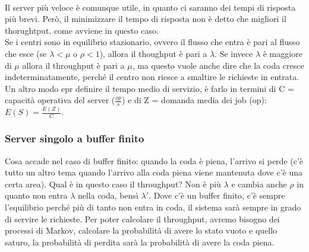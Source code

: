 \documentclass{article}
\begin{document}
\\Il server più veloce è comunque utile, in quanto ci saranno dei tempi di risposta più brevi. Però, il minimizzare il tempo di risposta non è detto che migliori il thorughtput, come avviene in questo caso.\\ Se i centri sono in equilibrio stazionario, ovvero il flusso che entra è pari al flusso che esce (se $\lambda < \mu$ o $\rho < 1$), allora il thoughput è pari a $\lambda$. Se invece $\lambda$ è maggiore di $\mu$ allora il throughput è pari a $\mu$, ma questo vuole anche dire che la coda cresce indeterminatamente, perché il centro non riesce a smaltire le richieste in entrata.\\ Un altro modo epr definire il tempo medio di servizio, è farlo in termini di C = capacità operativa del server ($\frac{op}{s}$) e di Z = domanda media dei job (op): $E(S) = \frac{E(Z)}{C}$.
\subsubsection{Server singolo a buffer finito}
Cosa accade nel caso di buffer finito: quando la coda è piena, l'arrivo si perde (c'è tutto un altro tema quando l'arrivo alla coda piena viene mantenuta dove c'è una certa area). Qual è in questo caso il throughput? Non è più $\lambda$ e cambia anche $\rho$ in quanto non entra $\lambda$ nella coda, bensì $\lambda'$. Dove c'è un buffer finito, c'è sempre l'equilibrio perché più di tanto non entra in coda, il sistema sarà sempre in grado di servire le richieste. Per poter calcolare il throughput, avremo bisogno dei processi di Markov, calcolare la probabilità di avere lo stato vuoto e quello saturo, la probabilità di perdita sarà la probabilità di avere la coda piena.
\end{document}
